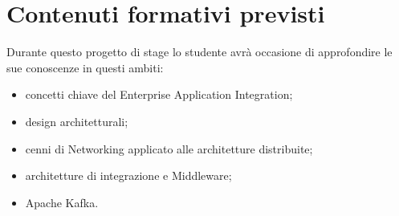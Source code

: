 \section*{Contenuti formativi previsti}
Durante questo progetto di stage lo studente avrà occasione di approfondire le sue conoscenze in questi ambiti:
\begin{itemize}
  \item concetti chiave del Enterprise Application Integration;
  \item design architetturali;
  \item cenni di Networking applicato alle architetture distribuite;
  \item architetture di integrazione e Middleware;
  \item Apache Kafka.
\end{itemize}
\newpage
